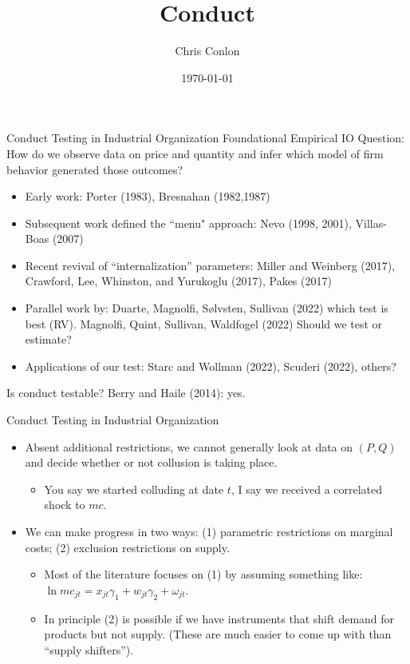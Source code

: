 \documentclass[xcolor=pdftex,dvipsnames,table,mathserif,aspectratio=169]{beamer}
\begin{document}
\title{Conduct}
\author{Chris Conlon}
\date{\today}

\frame{\titlepage}


\begin{frame}[plain]{Conduct Testing in Industrial Organization}
Foundational Empirical IO Question: How do we observe data on price and quantity and infer which model of firm behavior generated those outcomes?
\pause
\begin{itemize}
\item Early work: Porter (1983), Bresnahan (1982,1987)
\item Subsequent work defined the ``menu" approach: Nevo (1998, 2001), Villas-Boas (2007) 
\item Recent revival of ``internalization'' parameters: Miller and Weinberg (2017), Crawford, Lee, Whinston, and Yurukoglu (2017), Pakes (2017)
\item Parallel work by: Duarte, Magnolfi, Sølvsten, Sullivan (2022) which test is best (RV). Magnolfi, Quint, Sullivan, Waldfogel (2022) Should we test or estimate?
\item Applications of our test: Starc and Wollman (2022), Scuderi (2022), others?
\end{itemize}
Is conduct testable? Berry and Haile (2014): yes.
\end{frame}


\begin{frame}{Conduct Testing in Industrial Organization}
\begin{itemize}
\item Absent additional restrictions, we cannot generally look at data on $(P,Q)$ and decide whether or not collusion is taking place.
\begin{itemize}
\item You say we started colluding at date $t$, I say we received a correlated shock to $mc$.
\end{itemize}
\item We can make progress in two ways: (1) parametric restrictions on marginal costs; (2) exclusion restrictions on supply.
\begin{itemize}
\item Most of the literature focuses on (1) by assuming something like: $\ln mc_{jt} = x_{jt} \gamma_1 + w_{jt} \gamma_2 + \omega_{jt}$.
\item In principle (2) is possible if we have instruments that shift demand for products but not supply. (These are much easier to come up with than ``supply shifters'').
\end{itemize}
\end{itemize}
\end{frame}
\end{document}
